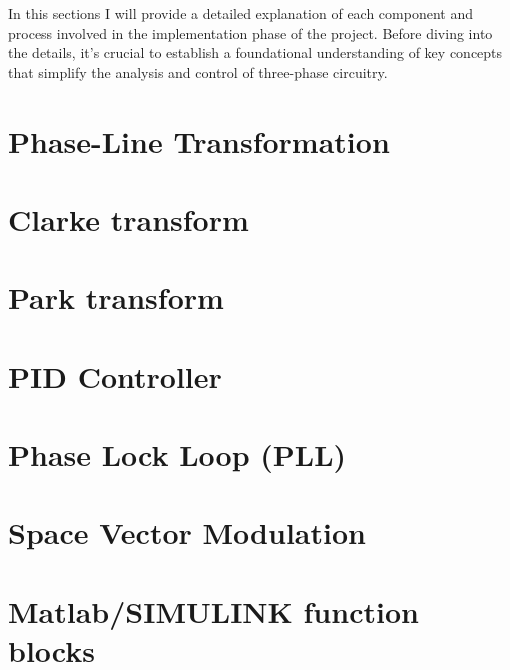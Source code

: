 In this sections I will provide a detailed explanation of each component and
process involved in the implementation phase of the project. Before diving into
the details, it's crucial to establish a foundational understanding of key
concepts that simplify the analysis and control of three-phase circuitry.

\section{Phase-Line Transformation}

\section{Clarke transform}

\section{Park transform}

\section{PID Controller}

\section{Phase Lock Loop (PLL)}

\section{Space Vector Modulation}

\section{Matlab/SIMULINK function blocks}

